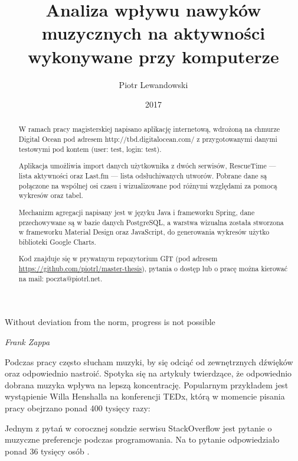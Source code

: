 \documentclass[brudnopis]{xmgr}
\author   {Piotr Lewandowski}
\title    {Analiza wpływu nawyków muzycznych na aktywności wykonywane przy komputerze}
\date     {2017}
\begin{document}
\begin{abstract}
    W ramach pracy magisterskiej napisano aplikację internetową,
    wdrożoną na chmurze Digital Ocean pod adresem http://tbd.digitalocean.com/
    z przygotowanymi danymi testowymi pod kontem (user: test, login: test).

    Aplikacja umożliwia import danych użytkownika z dwóch serwisów,
    RescueTime — lista aktywności oraz
    Last.fm — lista odsłuchiwanych utworów.
    Pobrane dane są połączone na wspólnej osi czasu i wizualizowane pod różnymi względami za pomocą wykresów oraz tabel.

    Mechanizm agregacji napisany jest w języku Java i frameworku Spring,
    dane przechowywane są w bazie danych PostgreSQL,
    a warstwa wizualna została stworzona w frameworku Material Design oraz JavaScript,
    do generowania wykresów użytko biblioteki Google Charts.

    Kod znajduje się w prywatnym repozytorium GIT (pod adresem \url{https://github.com/piotrl/master-thesis}),
    pytania o dostęp lub o pracę można kierować na mail: poczta@piotrl.net.
\end{abstract}


\maketitle

\introduction

\epigraph{Without deviation from the norm, progress is not possible}{\textit{Frank Zappa}}

Podczas pracy często słucham muzyki, by się odciąć od zewnętrznych dźwięków oraz odpowiednio nastroić.
Spotyka się na artykuły twierdzące, że odpowiednio dobrana muzyka wpływa na lepszą koncentrację.
Popularnym przykładem jest wystąpienie Willa Henshalla na konferencji TEDx,
którą w momencie pisania pracy obejrzano ponad 400 tysięcy razy:

Jednym z pytań w corocznej sondzie serwisu StackOverflow jest pytanie o muzyczne preferencje podczas programowania.
Na to pytanie odpowiedziało ponad 36 tysięcy osób \cite{stackoverflow:survey2017}.
\end{document}
